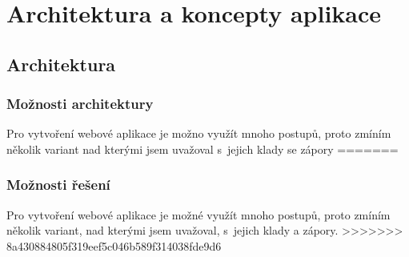 \documentclass[12pt, a4paper,
openright
]{report}
\let\oldchapter\chapter
\renewcommand{\chapter}{
	\clearpage
	\pagestyle{fancy}
	\oldchapter
}
\begin{document}
\chapter{Architektura a koncepty aplikace}

\section{Architektura}

\subsection{Možnosti architektury}
Pro vytvoření webové aplikace je možno využít mnoho postupů, proto zmíním několik variant nad kterými jsem uvažoval s~jejich klady se zápory
=======
\subsection{Možnosti řešení}
Pro vytvoření webové aplikace je možné využít mnoho postupů, proto zmíním několik variant, nad kterými jsem uvažoval, s~jejich klady a zápory.
>>>>>>> 8a430884805f319eef5c046b589f314038fde9d6
\end{document}

